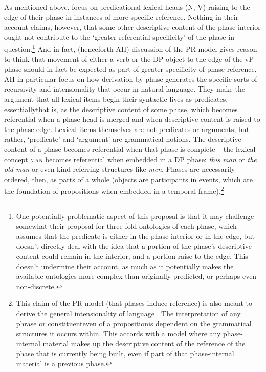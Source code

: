 As mentioned above, \citet{SheehanHinzen:2011} focus on predicational lexical heads (N, V) raising to the edge of their phase in instances of more specific reference. Nothing in their account claims, however, that some other descriptive content of the phase interior ought not contribute to the `greater referential specificity' of the phase in question.\footnote{One potentially problematic aspect of this proposal is that it may challenge somewhat their proposal for three-fold ontologies of each phase, which assumes that the predicate is either in the phase interior or in the edge, but doesn’t directly deal with the idea that a portion of the phase's descriptive content could remain in the interior, and a portion raise to the edge. This doesn’t undermine their account, as much as it potentially makes the available ontologies more complex than originally predicted, or perhaps even non-discrete.}  And in fact, \citet{ArsenijevicHinzen:2012} (henceforth AH) discussion of the PR model gives reason to think that movement of either a verb or the DP object to the edge of the vP phase should in fact be expected as part of greater specificity of phase reference. AH in particular focus on how derivation-by-phase generates the specific sorts of recursivity and intensionality that occur in natural language. They make the argument that all lexical items begin their syntactic lives as predicates, essentially\textemdash that is, as the descriptive content of some phase, which becomes referential when a phase head is merged and when descriptive content is raised to the phase edge. Lexical items themselves are not predicates or arguments, but rather, `predicate' and `argument' are grammatical notions. The descriptive content of a phase becomes referential when that phase is complete – the lexical concept \textsc{man} becomes referential when embedded in a DP phase: \textit{this man} or \textit{the old man} or even kind-referring structures like \textit{men}. Phases are necessarily ordered, then, as parts of a whole (objects are participants in events, which are the foundation of propositions when embedded in a temporal frame).\footnote{This claim of the PR model (that phases induce reference) is also meant to derive the general intensionality of language \citep{Hinzen:2014b,ArsenijevicHinzen:2012,HinzenSheehan:2013}. The interpretation of any phrase or constituent\textemdash even of a proposition\textemdash is dependent on the grammatical structures it occurs within. This accords with a model where any phase-internal material makes up the descriptive content of the reference of the phase that is currently being built, even if part of that phase-internal material is a previous phase.} 

